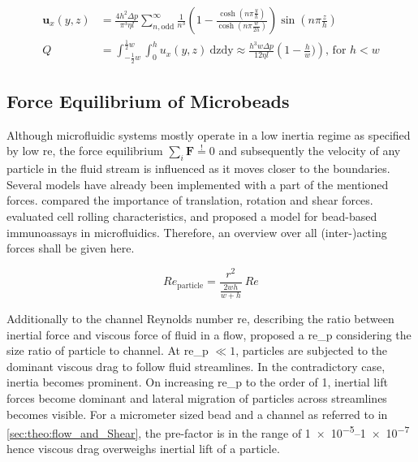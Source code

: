   \begin{align}
\mathbf{u}   _x(y,z) &= \frac{4 h^2 \Delta p}{\pi^3 \eta l} \sum_{n,\text{odd}}^{\infty} \frac{1}{n^3} \left( 1- \frac{\cosh (n \pi \frac{y}{h})}{\cosh (n \pi \frac{w}{2h})} \right) \sin (n \pi \frac{z}{h}) \label{eq:flowVelocityRect} \\
  Q    &= \int_{-\frac{1}{2}w}^{\frac{1}{2}w} \int_{0}^{h} u   _x(y,z) \ \mathrm{dzdy} \approx \frac{h^3 w \Delta p}{12 \eta l} \left( 1 - \frac{h}{w}) \right) \label{eq:flowRateRect} \text{, \ for \ } h < w
\end{align}


\subsection{Force Equilibrium of Microbeads}
\label{sec:theo:force}
Although microfluidic systems mostly operate in a low inertia regime as specified by low \gls{re}, the force equilibrium $\sum_{i} \mathbf{F} \overset{!}{=} 0$ and subsequently the velocity of any particle in the fluid stream is influenced as it moves closer to the boundaries. Several models have already been implemented with a part of the mentioned forces. \citet{lit:fluid:comparison} compared the importance of translation, rotation and shear forces. \citet{lit:fluidics:RollingCharacteristics} evaluated cell rolling characteristics, and \citet{lit:fluidic:ModelMIT} proposed a model for bead-based immunoassays in microfluidics. Therefore, an overview over all (inter-)acting forces shall be given here.

\begin{equation}
	\mathit{Re}_\text{particle} = \frac{r^2}{\frac{2wh}{w+h}} \ \mathit{Re} 
\end{equation}

Additionally to the channel Reynolds number \gls{re}, describing the ratio between inertial force and viscous force of fluid in a flow, \citet{lit:fluidic:f_wall} proposed a \gls{re_p} considering the size ratio of particle to channel. At \gls{re_p} $\ll 1$, particles are subjected to the dominant viscous drag to follow fluid streamlines. In the contradictory case, inertia becomes prominent. On increasing \gls{re_p} to the order of 1, inertial lift forces become dominant and lateral migration of particles across streamlines becomes visible.  For a micrometer sized bead and a channel as referred to in \cref{sec:theo:flow_and_Shear}, the pre-factor is in the range of \numrange{1e-5}{1e-7} hence viscous drag overweighs inertial lift of a particle.

